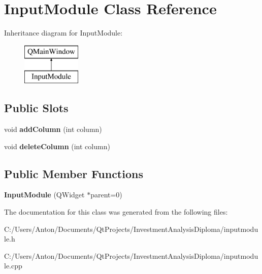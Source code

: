 \hypertarget{class_input_module}{}\section{Input\+Module Class Reference}
\label{class_input_module}
Inheritance diagram for Input\+Module\+:\begin{figure}[H]
\begin{center}
\leavevmode
\includegraphics[height=2.000000cm]{class_input_module}
\end{center}
\end{figure}
\subsection*{Public Slots}
\begin{DoxyCompactItemize}
\item 
\hypertarget{class_input_module_a98a75cba7c65889bc27d5f052693a975}{}void {\bfseries add\+Column} (int column)\label{class_input_module_a98a75cba7c65889bc27d5f052693a975}

\item 
\hypertarget{class_input_module_aa344a18931623103e86a47499b0c9577}{}void {\bfseries delete\+Column} (int column)\label{class_input_module_aa344a18931623103e86a47499b0c9577}

\end{DoxyCompactItemize}
\subsection*{Public Member Functions}
\begin{DoxyCompactItemize}
\item 
\hypertarget{class_input_module_a05cd7a5cdeb8a523e937a998df8c9936}{}{\bfseries Input\+Module} (Q\+Widget $\ast$parent=0)\label{class_input_module_a05cd7a5cdeb8a523e937a998df8c9936}

\end{DoxyCompactItemize}


The documentation for this class was generated from the following files\+:\begin{DoxyCompactItemize}
\item 
C\+:/\+Users/\+Anton/\+Documents/\+Qt\+Projects/\+Investment\+Analysis\+Diploma/inputmodule.\+h\item 
C\+:/\+Users/\+Anton/\+Documents/\+Qt\+Projects/\+Investment\+Analysis\+Diploma/inputmodule.\+cpp\end{DoxyCompactItemize}
